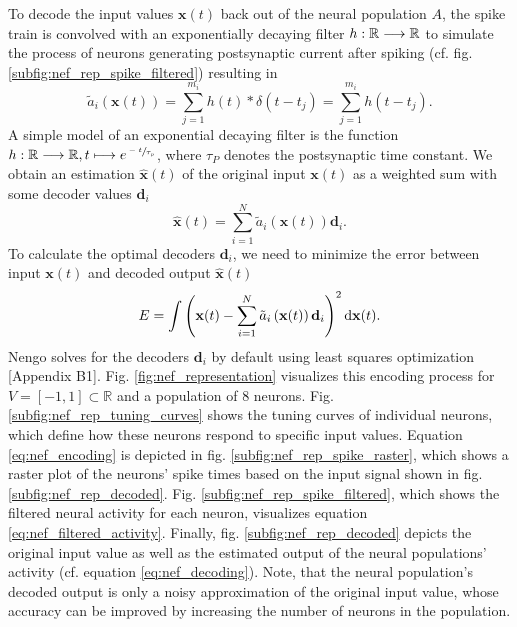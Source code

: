 To decode the input values $\mathbf{x}(t)$ back out of the neural population $A$, the spike train is convolved with an exponentially decaying filter $h: \mathbb{R} \longrightarrow \mathbb{R}$ to simulate the process of neurons generating postsynaptic current after spiking (cf. fig. \ref{subfig:nef_rep_spike_filtered}) resulting in
\begin{equation}
\tilde{a}_{i}\left(\mathbf{x}(t)\right) = \sum_{j=1}^{m_{i}} h(t) \ast \delta(t - t_{j}) = \sum_{j=1}^{m_{i}} h(t - t_{j}).
\label{eq:nef_filtered_activity}
\end{equation}
A simple model of an exponential decaying filter is the function $h: \mathbb{R} \longrightarrow \mathbb{R}, t \longmapsto e^{\sfrac{-t}{\tau_{p}}}$, where $\tau_{P}$ denotes the postsynaptic time constant.
We obtain an estimation $\mathbf{\hat{x}}(t)$ of the original input $\mathbf{x}(t)$ as a weighted sum with some decoder values $\mathbf{d}_{i}$
\begin{equation}
\mathbf{\hat{x}}(t) = \sum_{i=1}^{N} \tilde{a}_{i}\left(\mathbf{x}(t)\right) \mathbf{d}_{i}.
\label{eq:nef_decoding}
\end{equation}
To calculate the optimal decoders $\mathbf{d}_{i}$, we need to minimize the error between input $\mathbf{x}(t)$ and decoded output $\mathbf{\hat{x}}(t)$
\begin{equation}
E = \int \left( \mathbf{x}(t) - \sum_{i=1}^{N} \tilde{a}_{i}\left(\mathbf{x}(t)\right) \mathbf{d}_{i}\right)^{2} \mathop{}\!\mathrm{d} \mathbf{x}(t).
\label{eq:decoder_calculation}
\end{equation}
\ac{Nengo} solves for the decoders $\mathbf{d}_{i}$ by default using least squares optimization \cite{Eliasmith2013}[Appendix B1].
Fig. \ref{fig:nef_representation} visualizes this encoding process for $V = \left[ -1, 1\right] \subset \mathbb{R}$ and a population of $8$ neurons.
Fig. \ref{subfig:nef_rep_tuning_curves} shows the tuning curves of individual neurons, which define how these neurons respond to specific input values.
Equation \ref{eq:nef_encoding} is depicted in fig. \ref{subfig:nef_rep_spike_raster}, which shows a raster plot of the neurons' spike times based on the input signal shown in fig. \ref{subfig:nef_rep_decoded}.
Fig. \ref{subfig:nef_rep_spike_filtered}, which shows the filtered neural activity for each neuron, visualizes equation \ref{eq:nef_filtered_activity}.
Finally, fig. \ref{subfig:nef_rep_decoded} depicts the original input value as well as the estimated output of the neural populations' activity (cf. equation \ref{eq:nef_decoding}).
Note, that the neural population's decoded output is only a noisy approximation of the original input value, whose accuracy can be improved by increasing the number of neurons in the population.
